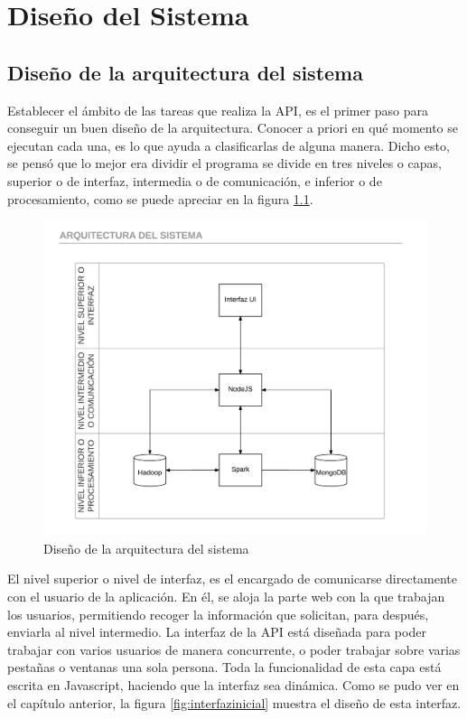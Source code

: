 \chapter{Diseño del Sistema}

\section{Diseño de la arquitectura del sistema}
Establecer el ámbito de las tareas que realiza la API, es el primer paso para conseguir un buen diseño de la arquitectura. Conocer a priori en qué momento se ejecutan cada una, es lo que ayuda a clasificarlas de alguna manera. Dicho esto, se pensó que lo mejor era dividir el programa se divide en tres niveles o capas, superior o de interfaz, intermedia o de comunicación, e inferior o de procesamiento, como se puede apreciar en la figura \ref{fig:arquitecturadelsistema}. 

\begin{figure}
	\centering
	\includegraphics[width=1\linewidth]{imagenes/Arquitectura_del_sistema}
	\caption{Diseño de la arquitectura del sistema}
	\label{fig:arquitecturadelsistema}
\end{figure}

El nivel superior o nivel de interfaz, es el encargado de comunicarse directamente con el usuario de la aplicación. En él, se aloja la parte web con la que trabajan los usuarios, permitiendo recoger la información que solicitan, para después, enviarla al nivel intermedio. La interfaz de la API está diseñada para poder trabajar con varios usuarios de manera concurrente, o poder trabajar sobre varias pestañas o ventanas una sola persona. Toda la funcionalidad de esta capa está escrita en Javascript, haciendo que la interfaz sea dinámica. Como se pudo ver en el capítulo anterior, la figura \ref{fig:interfazinicial} muestra el diseño de esta interfaz.

